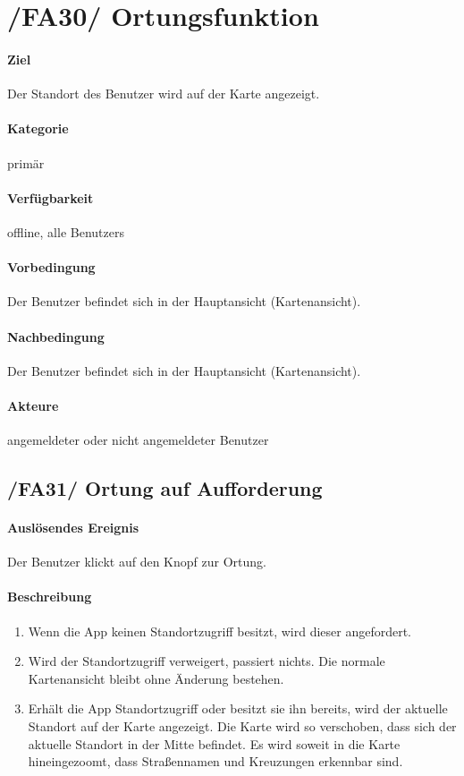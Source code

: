 \section[Ortungsfunktion]{/FA30/ Ortungsfunktion}
\label{/FA30/}
\paragraph{Ziel}
Der Standort des \Gls{Benutzer} wird auf der \Gls{Karte} angezeigt.
\paragraph{Kategorie}
primär
\paragraph{Verfügbarkeit}
\gls{offline}, alle \Glspl{Benutzer}
\paragraph{Vorbedingung}
Der \Gls{Benutzer} befindet sich in der Hauptansicht (\Gls{Kartenansicht}).
\paragraph{Nachbedingung}
Der \Gls{Benutzer} befindet sich in der Hauptansicht (\Gls{Kartenansicht}).
\paragraph{Akteure}
angemeldeter oder nicht angemeldeter \Gls{Benutzer}

\subsection*{/FA31/ Ortung auf Aufforderung}
\label{/FA31/}
\paragraph{Auslösendes Ereignis}
Der \Gls{Benutzer} klickt auf den Knopf zur Ortung.
\paragraph{Beschreibung}
\begin{enumerate}
    \item Wenn die App keinen Standortzugriff besitzt, wird dieser angefordert.
    \item Wird der Standortzugriff verweigert, passiert nichts. Die normale \Gls{Kartenansicht} bleibt ohne Änderung bestehen.
    \item Erhält die App Standortzugriff oder besitzt sie ihn bereits, wird der aktuelle Standort auf der \Gls{Karte} angezeigt. Die \Gls{Karte} wird so verschoben, dass sich der aktuelle Standort in der Mitte befindet. Es wird soweit in die \Gls{Karte} hineingezoomt, dass Straßennamen und Kreuzungen erkennbar sind.
\end{enumerate}


